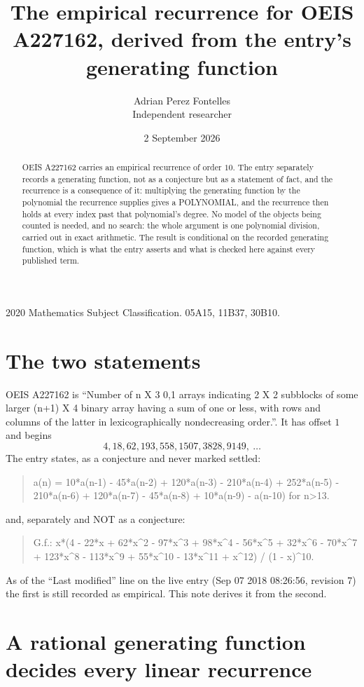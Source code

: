 \documentclass[11pt,a4paper]{article}
\title{The empirical recurrence for OEIS A227162, derived from the entry's generating function}
\author{Adrian Perez Fontelles\\ \small Independent researcher}
\date{2 September 2026}
\theoremstyle{plain}
\theoremstyle{definition}
\begin{document}
\maketitle

\begin{abstract}
OEIS A227162 carries an empirical recurrence of order $10$. The entry separately records a
generating function, not as a conjecture but as a statement of fact, and the recurrence is a
consequence of it: multiplying the generating function by the polynomial the recurrence
supplies gives a POLYNOMIAL, and the recurrence then holds at every index past that
polynomial's degree. No model of the objects being counted is needed, and no search: the
whole argument is one polynomial division, carried out in exact arithmetic. The result is
conditional on the recorded generating function, which is what the entry asserts and what is
checked here against every published term.
\end{abstract}

\noindent\small 2020 Mathematics Subject Classification. 05A15, 11B37, 30B10.\normalsize

\section{The two statements}

OEIS A227162 is ``Number of n X 3 0,1 arrays indicating 2 X 2 subblocks of some larger (n+1) X 4 binary array having a sum of one or less, with rows and columns of the latter in lexicographically nondecreasing order.''. It has offset $1$ and begins
\[
4, 18, 62, 193, 558, 1507, 3828, 9149,\ \dots
\]
The entry states, as a conjecture and never marked settled:
\begin{quote}
a(n) = 10*a(n-1) - 45*a(n-2) + 120*a(n-3) - 210*a(n-4) + 252*a(n-5) - 210*a(n-6) + 120*a(n-7) - 45*a(n-8) + 10*a(n-9) - a(n-10) for n>13.
\end{quote}
and, separately and NOT as a conjecture:
\begin{quote}
G.f.: x*(4 - 22*x + 62*x\^{}2 - 97*x\^{}3 + 98*x\^{}4 - 56*x\^{}5 + 32*x\^{}6 - 70*x\^{}7 + 123*x\^{}8 - 113*x\^{}9 + 55*x\^{}10 - 13*x\^{}11 + x\^{}12) / (1 - x)\^{}10.
\end{quote}
As of the ``Last modified'' line on the live entry (Sep 07 2018 08:26:56, revision 7) the first is still
recorded as empirical. This note derives it from the second.

\section{A rational generating function decides every linear recurrence}
\end{document}

